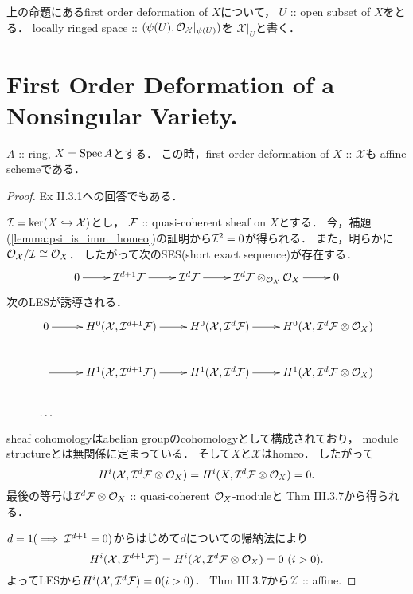 \documentclass[a4paper]{jsarticle}
\newcommand{\defX}{\mathcal{X}}
\begin{document}
    \begin{Def}
        上の命題にあるfirst order deformation of $X$について，
        $U$ :: open subset of $X$をとる．
        locally ringed space :: $(\psi(U), \shO_{\defX}|_{\psi(U)})$を
        $\defX|_U$と書く．
    \end{Def}

\section{First Order Deformation of a Nonsingular Variety.}
    \begin{Lemma}\label{lemma:def_of_affine_is_affine}
        $A$ :: ring, $X=\operatorname{Spec} A$とする．
        この時，first order deformation of $X$ :: $\defX$も
        affine schemeである．
    \end{Lemma}
    \begin{proof}
        \cite{HarAG} Ex II.3.1への回答でもある．
        
        $\shI=\ker(X \inclmap \defX)$とし，
        $\mathcal{F}$ :: quasi-coherent sheaf on $X$とする．
        今，補題(\ref{lemma:psi_is_imm_homeo})の証明から$\mathcal{I}^2=0$が得られる．
        また，明らかに$\shO_{\defX}/\shI \iso \shO_{X}$．
        したがって次のSES(short exact sequence)が存在する．
        \[\xymatrix{
            0 \ar[r]& \shI^{d+1} \shF \ar[r]& \shI^{d} \shF \ar[r]&
                \shI^{d}\shF \otimes_{\shO_{\defX}} \shO_X \ar[r]& 0
        }\]
        次のLESが誘導される．
        \[\xymatrix{
            0 \ar[r]& H^0(\defX, \shI^{d+1} \shF) \ar[r]& H^0(\defX, \shI^{d} \shF) \ar[r]& H^0(\defX, \shI^{d}\shF \otimes \shO_X) \\
            {}\ar[r]& H^1(\defX, \shI^{d+1} \shF) \ar[r]& H^1(\defX, \shI^{d} \shF) \ar[r]& H^1(\defX, \shI^{d}\shF \otimes \shO_X) \\
            \dots
        }\]
        
        sheaf cohomologyはabelian groupのcohomologyとして構成されており，
        module structureとは無関係に定まっている．
        そして$X$と$\defX$はhomeo．
        したがって
        \[ H^i(\defX, \shI^{d}\shF \otimes \shO_X)=H^i(X, \shI^{d}\shF \otimes \shO_X)=0. \]
        最後の等号は$\mathcal{I}^{d}\mathcal{F} \otimes \mathcal{O}_X$ :: quasi-coherent $\mathcal{O}_X$-moduleと
        \cite{HarAG} Thm III.3.7から得られる．
        
        $d=1 (\implies \mathcal{I}^{d+1}=0)$からはじめて$d$についての帰納法により
        \[ H^i(\defX, \shI^{d+1} \shF)=H^i(\defX, \shI^{d}\shF \otimes \shO_X)=0 \ (i>0). \]
        よってLESから$H^i(\defX, \shI^{d} \shF)=0 (i>0)$．
        \cite{HarAG} Thm III.3.7から$\defX$ :: affine.
    \end{proof}
\end{document}
